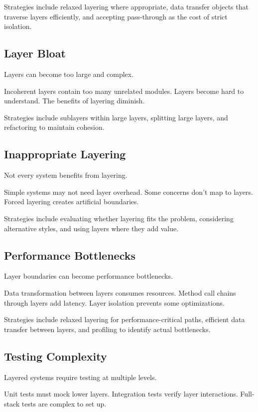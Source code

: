 \documentclass[11pt]{article}
\begin{document}
Strategies include relaxed layering where appropriate, data transfer objects that traverse layers efficiently, and accepting pass-through as the cost of strict isolation.

\subsection{Layer Bloat}

Layers can become too large and complex.

Incoherent layers contain too many unrelated modules. Layers become hard to understand. The benefits of layering diminish.

Strategies include sublayers within large layers, splitting large layers, and refactoring to maintain cohesion.

\subsection{Inappropriate Layering}

Not every system benefits from layering.

Simple systems may not need layer overhead. Some concerns don't map to layers. Forced layering creates artificial boundaries.

Strategies include evaluating whether layering fits the problem, considering alternative styles, and using layers where they add value.

\subsection{Performance Bottlenecks}

Layer boundaries can become performance bottlenecks.

Data transformation between layers consumes resources. Method call chains through layers add latency. Layer isolation prevents some optimizations.

Strategies include relaxed layering for performance-critical paths, efficient data transfer between layers, and profiling to identify actual bottlenecks.

\subsection{Testing Complexity}

Layered systems require testing at multiple levels.

Unit tests must mock lower layers. Integration tests verify layer interactions. Full-stack tests are complex to set up.
\end{document}
